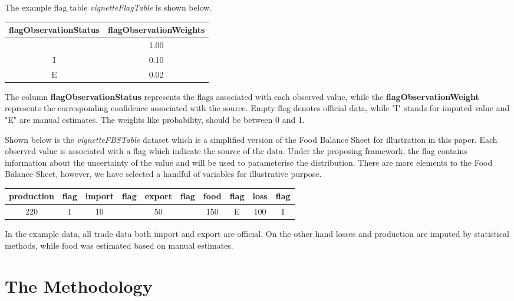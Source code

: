 \documentclass[nojss]{jss}\usepackage[]{graphicx}\usepackage[]{color}
\begin{document}
The example flag table \textit{vignetteFlagTable} is shown below.

\begin{table}[ht]
\centering
\begin{tabular}{cc}
  \hline
flagObservationStatus & flagObservationWeights \\ 
  \hline
 & 1.00 \\ 
  I & 0.10 \\ 
  E & 0.02 \\ 
   \hline
\end{tabular}
\end{table}


The column \textbf{flagObservationStatus} represents the flags
associated with each observed value, while the
\textbf{flagObservationWeight} represents the corresponding confidence
associated with the source. Empty flag denotes official data, while
"I" stands for imputed value and "E" are manual estimates. The weights
like probability, should be between 0 and 1.


Shown below is the \textit{vignetteFBSTable} dataset which is a
simplified version of the Food Balance Sheet for illustration in this
paper. Each observed value is associated with a flag which indicate
the source of the data. Under the proposing framework, the flag
contains information about the uncertainty of the value and will be
used to parameterise the distribution. There are more elements to the
Food Balance Sheet, however, we have selected a handful of variables
for illustrative purpose.


\begin{table}[ht]
\centering
\begin{tabular}{cccccccccc}
  \hline
production & flag & import & flag & export & flag & food & flag & loss & flag \\ 
  \hline
220 & I & 10 &  & 50 &  & 150 & E & 100 & I \\ 
   \hline
\end{tabular}
\end{table}


In the example data, all trade data both import and export are
official. On the other hand losses and production are imputed by
statistical methods, while food was estimated based on manual
estimates.


\section{The Methodology}
\end{document}
